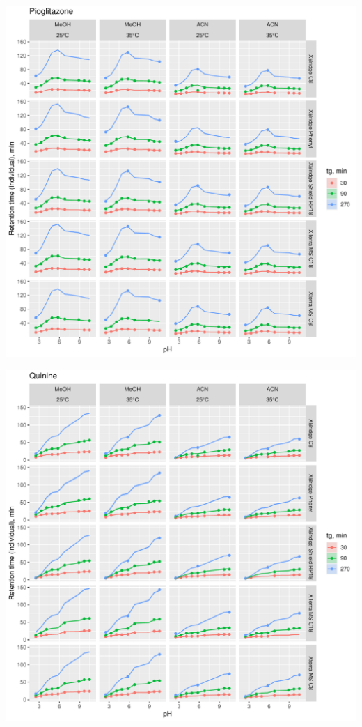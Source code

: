 \documentclass[
]{article}
\begin{document}
\newpage{}

\includegraphics{../figures/concordanceplots/Pioglitazone.individual.pdf}

\newpage{}

\includegraphics{../figures/concordanceplots/Quinine.individual.pdf}
\end{document}
